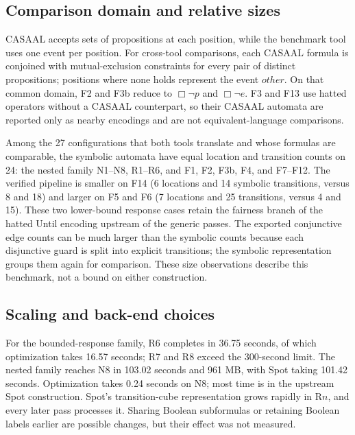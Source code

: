 \documentclass{ieeeaccess}
\begin{document}
\subsection{Comparison domain and relative sizes}
CASAAL accepts sets of propositions at each position, while the benchmark
tool uses one event per position. For cross-tool comparisons, each CASAAL
formula is conjoined with mutual-exclusion constraints for every pair of
distinct propositions; positions where none holds represent the event
$\mathit{other}$. On that common domain, F2 and F3b reduce to
$\Box\neg p$ and $\Box\neg e$. F3 and F13 use hatted operators without a
CASAAL counterpart, so their CASAAL automata are reported only as nearby
encodings and are not equivalent-language comparisons.

Among the 27 configurations that both tools translate and whose formulas
are comparable, the symbolic automata have equal location and transition
counts on 24: the nested family N1--N8, R1--R6, and F1, F2, F3b, F4, and
F7--F12. The verified pipeline is smaller on F14 (6 locations and 14
symbolic transitions, versus 8 and 18) and larger on F5 and F6 (7 locations
and 25 transitions, versus 4 and 15). These two lower-bound response cases
retain the fairness branch of the hatted Until encoding upstream of the
generic passes. The exported conjunctive edge counts can be much larger than
the symbolic counts because each disjunctive guard is split into explicit
transitions; the symbolic representation groups them again for comparison.
These size observations describe this benchmark, not a bound on either
construction.

\subsection{Scaling and back-end choices}
For the bounded-response family, R6 completes in 36.75 seconds, of which optimization takes 16.57 seconds; R7 and R8 exceed the 300-second limit. The nested family reaches N8 in 103.02 seconds and 961 MB, with Spot taking 101.42 seconds. Optimization takes 0.24 seconds on N8; most time is in the upstream Spot construction. Spot's transition-cube representation grows rapidly in R$n$, and every later pass processes it. Sharing Boolean subformulas or retaining Boolean labels earlier are possible changes, but their effect was not measured.
\end{document}
